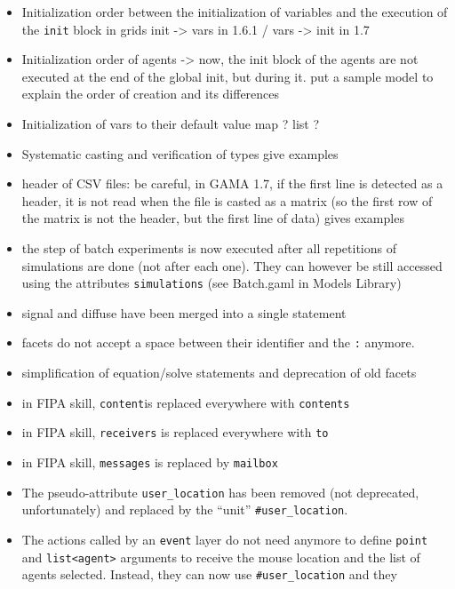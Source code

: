 \documentclass[]{book}
\providecommand{\tightlist}{%
  \setlength{\itemsep}{0pt}\setlength{\parskip}{0pt}}
\theoremstyle{definition}
\theoremstyle{definition}
\theoremstyle{definition}
\theoremstyle{remark}
\begin{document}
\begin{itemize}
\tightlist
\item
  Initialization order between the initialization of variables and the
  execution of the \texttt{init} block in grids init -\textgreater{}
  vars in 1.6.1 / vars -\textgreater{} init in 1.7
\item
  Initialization order of agents -\textgreater{} now, the init block of
  the agents are not executed at the end of the global init, but during
  it. put a sample model to explain the order of creation and its
  differences
\item
  Initialization of vars to their default value map ? list ?
\item
  Systematic casting and verification of types give examples
\item
  header of CSV files: be careful, in GAMA 1.7, if the first line is
  detected as a header, it is not read when the file is casted as a
  matrix (so the first row of the matrix is not the header, but the
  first line of data) gives examples
\item
  the step of batch experiments is now executed after all repetitions of
  simulations are done (not after each one). They can however be still
  accessed using the attributes \texttt{simulations} (see Batch.gaml in
  Models Library)
\item
  signal and diffuse have been merged into a single statement
\item
  facets do not accept a space between their identifier and the
  \texttt{:} anymore.
\item
  simplification of equation/solve statements and deprecation of old
  facets
\item
  in FIPA skill, \texttt{content}is replaced everywhere with
  \texttt{contents}
\item
  in FIPA skill, \texttt{receivers} is replaced everywhere with
  \texttt{to}
\item
  in FIPA skill, \texttt{messages} is replaced by \texttt{mailbox}
\item
  The pseudo-attribute \texttt{user\_location} has been removed (not
  deprecated, unfortunately) and replaced by the ``unit''
  \texttt{\#user\_location}.
\item
  The actions called by an \texttt{event} layer do not need anymore to
  define \texttt{point} and \texttt{list\textless{}agent\textgreater{}}
  arguments to receive the mouse location and the list of agents
  selected. Instead, they can now use \texttt{\#user\_location} and they

\end{itemize}
\end{document}

